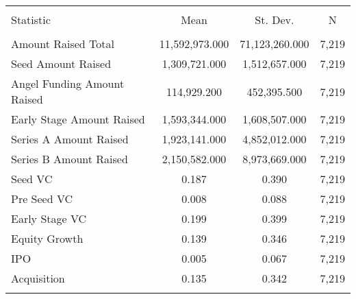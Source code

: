 
\begin{tabular}{@{\extracolsep{5pt}}lccc} 
\\[-1.8ex]\hline 
\hline \\[-1.8ex] 
Statistic & \multicolumn{1}{c}{Mean} & \multicolumn{1}{c}{St. Dev.} & \multicolumn{1}{c}{N} \\ 
\hline \\[-1.8ex] 
Amount Raised Total & 11,592,973.000 & 71,123,260.000 & 7,219 \\ 
Seed Amount Raised & 1,309,721.000 & 1,512,657.000 & 7,219 \\ 
Angel Funding Amount Raised & 114,929.200 & 452,395.500 & 7,219 \\ 
Early Stage Amount Raised & 1,593,344.000 & 1,608,507.000 & 7,219 \\ 
Series A Amount Raised & 1,923,141.000 & 4,852,012.000 & 7,219 \\ 
Series B Amount Raised & 2,150,582.000 & 8,973,669.000 & 7,219 \\ 
Seed VC & 0.187 & 0.390 & 7,219 \\ 
Pre Seed VC & 0.008 & 0.088 & 7,219 \\ 
Early Stage VC & 0.199 & 0.399 & 7,219 \\ 
Equity Growth & 0.139 & 0.346 & 7,219 \\ 
IPO & 0.005 & 0.067 & 7,219 \\ 
Acquisition & 0.135 & 0.342 & 7,219 \\ 
\hline \\[-1.8ex] 
\end{tabular} 
